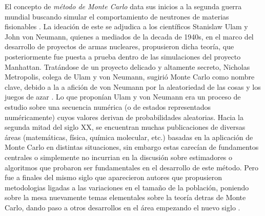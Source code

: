 \noindent El concepto de \textit{método de Monte Carlo} data sus inicios a la segunda guerra mundial buscando simular el comportamiento de neutrones de materias fisionables \citep{haro2021}. La ideación de este se adjudica a los científicos Stanislaw  Ulam y John von Neumann, quienes a mediados de la decada de 1940s, en el marco del desarrollo de proyectos de armas nucleares, propusieron dicha teoría, que posteriormente fue puesta a prueba dentro de las simulaciones del proyecto Manhattan. Tratándose de un proyecto delicado y altamente secreto, Nicholas Metropolis, colega de Ulam y von Neumann, sugirió Monte Carlo como nombre clave, debido a la a afición de von Neumann por la aleatoriedad de las cosas y los juegos de azar \citep{metropolis1987}. Lo que proponían Ulam y von Neumann era un proceso de estudio sobre una secuencia numérica (o de estados representados numéricamente) cuyos valores derivan de probabilidades aleatorias.
\newline \newline
Hacia la segunda mitad del siglo XX, se encuentran muchas publicaciones de diversas áreas (matemáticas, física, química molecular, etc.) basadas en la aplicación de Monte Carlo en distintas situaciones, sin embargo estas carecían de fundamentos centrales o simplemente no incurrian en la discusión sobre estimadores o algoritmos que probaron ser fundamentales en el desarrollo de este método. Pero fue a finales del mismo siglo que aparecieron autores que propusieron metodologias ligadas a las variaciones en el tamaño de la población, poniendo sobre la mesa nuevamente temas elementales sobre la teoría detras de Monte Carlo, dando paso a otros desarrollos en el área empezando el nuevo siglo \citep{delmoral1997,delmoral1998,crisan1998,delmoral2001}.

